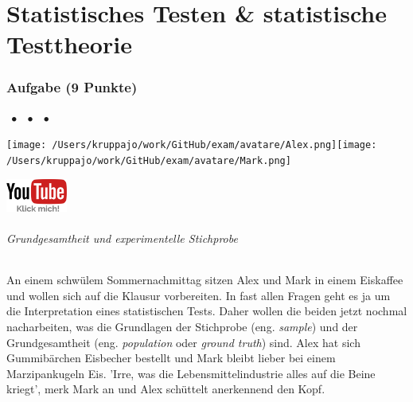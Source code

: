 \documentclass[a4paper, 9pt]{scrartcl}\usepackage[]{graphicx}\usepackage[]{xcolor}
\begin{document}
\part{Statistisches Testen \& statistische Testtheorie}

\section{Aufgabe \hfill (9 Punkte)}


 
\ifcollection
\begin{flushright}
\tiny
\textbf{\examinhaltstart}
\exammodulestat $\;\bullet$
\exammodulestatbbv $\;\bullet$
\exammodulestatversuch $\;\bullet$
\exammodulebiostat
\vspace{-4Ex}
\end{flushright}
\begin{minipage}[t]{0.5\textwidth}
\texttt{[image: /Users/kruppajo/work/GitHub/exam/avatare/Alex.png]}\hspace{-4mm}\texttt{[image: /Users/kruppajo/work/GitHub/exam/avatare/Mark.png]}
\end{minipage}
\begin{minipage}[t]{0.5\textwidth}
\hfill
\href{https://youtu.be/KxDklbFEEHw}{\includegraphics[width = 2cm]{img/youtube}}
\end{minipage}
\fi



\ifcollection
\paragraph{Grundgesamtheit und experimentelle Stichprobe}
\fi

An einem schwülem Sommernachmittag sitzen Alex und Mark in einem Eiskaffee und wollen sich auf die Klausur vorbereiten. In fast allen Fragen geht es ja um die Interpretation eines statistischen Tests. Daher wollen die beiden jetzt nochmal nacharbeiten, was die Grundlagen der Stichprobe (eng. \textit{sample}) und der Grundgesamtheit (eng. \textit{population} oder \textit{ground truth}) sind. Alex hat sich Gummibärchen Eisbecher bestellt und Mark bleibt lieber bei einem Marzipankugeln Eis. 'Irre, was die Lebensmittelindustrie alles auf die Beine kriegt', merk Mark an und Alex schüttelt anerkennend den Kopf.
\end{document}
